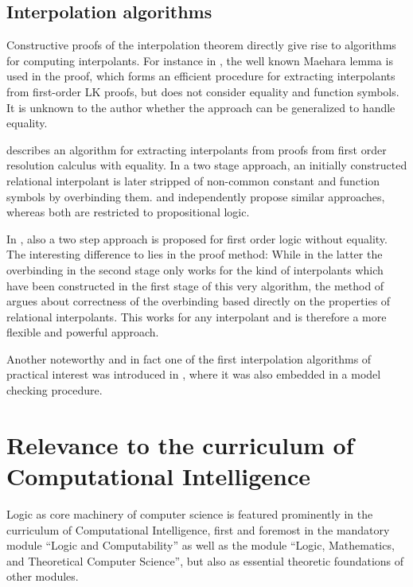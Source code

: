 \documentclass[,%
			paper=a4,%
			DIV11, %
			liststotoc,
			bibtotoc,
			draft=false,%
			numbers=noendperiod
			]{scrartcl}
\theoremstyle{definition}
\begin{document}
\subsection{Interpolation algorithms}
\label{algos}

Constructive proofs of the interpolation theorem directly give rise to algorithms for computing interpolants.
For instance in \cite[theorem 6.6]{takeuti1987proof}, the well known Maehara lemma is used in the proof, which forms an efficient procedure for extracting interpolants from first-order LK proofs, but does not consider equality and function symbols.
It is unknown to the author whether the approach can be generalized to handle equality.

\cite{Huang95} describes an algorithm for extracting interpolants from proofs from first order resolution calculus with equality.
In a two stage approach, an initially constructed relational interpolant is later stripped of non-common constant and function symbols by overbinding them.
\cite{Pudlak97} and \cite{krajivcek1997interpolation} independently propose similar approaches, whereas both are restricted to propositional logic.

In \cite{baaz2011methods}, also a two step approach is proposed for first order logic without equality.
The interesting difference to \cite{Huang95} lies in the proof method:
While in the latter the overbinding in the second stage only works for the kind of interpolants which have been constructed in the first stage of this very algorithm, the method of \cite{baaz2011methods} argues about correctness of the overbinding based directly on the properties of relational interpolants.
This works for any interpolant and is therefore a more flexible and powerful approach.

Another noteworthy and in fact one of the first interpolation algorithms of practical interest was introduced in \cite{McMillan03}, where it was also embedded in a model checking procedure.




\section{Relevance to the curriculum of Computational Intelligence}

Logic as core machinery of computer science is featured prominently in the curriculum of Computational Intelligence, first and foremost in the mandatory module ``Logic and Computability'' as well as the module ``Logic, Mathematics, and Theoretical Computer Science'', but also as essential theoretic foundations of other modules. 
\end{document}
